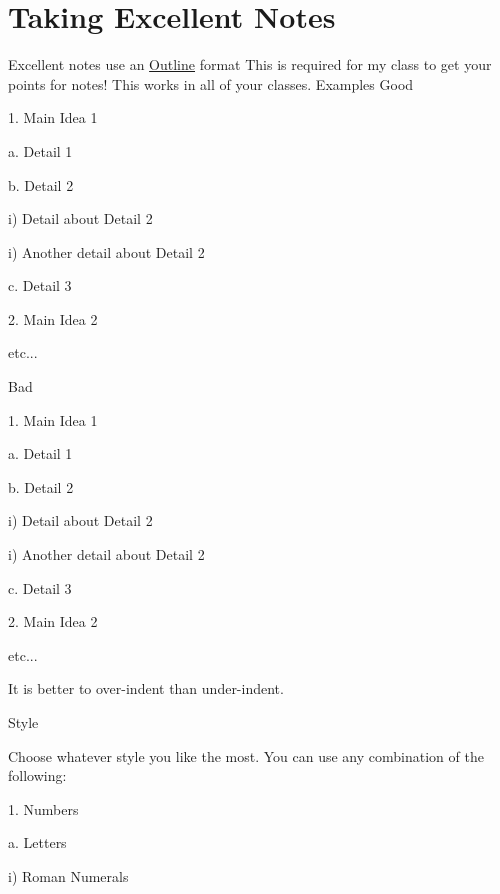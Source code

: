 \documentclass[../main.tex]{subfiles}
\begin{document}
\chapter{Taking Excellent Notes}

\begin{outline}[enumerate]

\1 Excellent notes use an \underline{Outline} format
	\2	\color{dracRed}This is required for my class to get your points for notes!\color{black}
	\2 This works in all of your classes.
\1 Examples
	\2 \color{dracGreen}Good\color{black}



	1. Main Idea 1

	\quad a. Detail 1

	\quad b. Detail 2


	\quad \quad i) Detail about Detail 2

	\quad \quad i) Another detail about Detail 2

	\quad c. Detail 3

	2. Main Idea 2

	etc...

	\2 \color{dracRed}Bad\color{black}


	1. Main Idea 1

	a. Detail 1

	b. Detail 2

	i) Detail about Detail 2

	i) Another detail about Detail 2

	c. Detail 3

	2. Main Idea 2

	etc...


	\1 It is better to over-indent than under-indent.

	\1 Style

		\2 Choose whatever style you like the most.  You can use any combination of the following:

	\begin{displayquote}

	1. Numbers

	\quad a. Letters

	\quad \quad i) Roman Numerals


\end{displayquote}
\end{outline}
\end{document}
